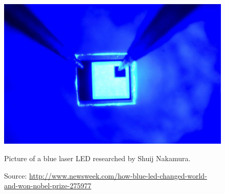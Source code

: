 \begin{figure}[!h]
\centering
\includegraphics{./0_intro/img/10-7-14-nobel-prize-blue-led.jpg}
\label{fig:philips_sl}
\caption{Picture of a blue laser LED researched by Shuij Nakamura.}
\caption*{Source: \url{http://www.newsweek.com/how-blue-led-changed-world-and-won-nobel-prize-275977} }  
\end{figure}

